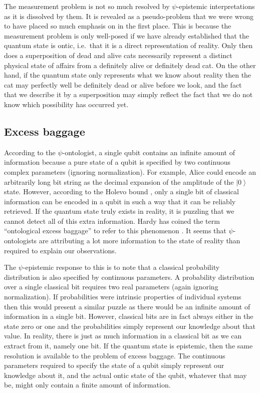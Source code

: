 \documentclass[DIV=calc,paper=a4,fontsize=11pt,twocolumn]{scrartcl} %
\theoremstyle{definition}
\theoremstyle{plain}
\newcommand{\Ket}[1]{\ensuremath{\left \vert #1 \right \rangle}}
\begin{document}
The measurement problem is not so much resolved by $\psi$-epistemic
interpretations as it is dissolved by them.  It is revealed as a
pseudo-problem that we were wrong to have placed so much emphasis on
in the first place.  This is because the measurement problem is only
well-posed if we have already established that the quantum state is
ontic, i.e.\ that it is a direct representation of reality.  Only then
does a superposition of dead and alive cats necessarily represent a
distinct physical state of affairs from a definitely alive or
definitely dead cat.  On the other hand, if the quantum state only
represents what we know about reality then the cat may perfectly well
be definitely dead or alive before we look, and the fact that we
describe it by a superposition may simply reflect the fact that we do
not know which possibility has occurred yet.

\subsection{Excess baggage}

\label{Excess}

According to the $\psi$-ontologist, a single qubit contains an
infinite amount of information because a pure state of a qubit is
specified by two continuous complex parameters (ignoring
normalization).  For example, Alice could encode an arbitrarily long
bit string as the decimal expansion of the amplitude of the $\Ket{0}$
state.  However, according to the Holevo bound \cite{Holevo1973}, only
a single bit of classical information can be encoded in a qubit in
such a way that it can be reliably retrieved.  If the quantum state
truly exists in reality, it is puzzling that we cannot detect all of
this extra information.  Hardy has coined the term ``ontological
excess baggage'' to refer to this phenomenon \cite{Hardy2004}.  It
seems that $\psi$-ontologists are attributing a lot more information
to the state of reality than required to explain our observations.

The $\psi$-epistemic response to this is to note that a classical
probability distribution is also specified by continuous parameters.
A probability distribution over a single classical bit requires two
real parameters (again ignoring normalization).  If probabilities were
intrinsic properties of individual systems then this would present a
similar puzzle as there would be an infinite amount of information in
a single bit.  However, classical bits are in fact always either in
the state zero or one and the probabilities simply represent our
knowledge about that value.  In reality, there is just as much
information in a classical bit as we can extract from it, namely one
bit.  If the quantum state is epistemic, then the same resolution is
available to the problem of excess baggage.  The continuous parameters
required to specify the state of a qubit simply represent our
knowledge about it, and the actual ontic state of the qubit, whatever
that may be, might only contain a finite amount of information.
\end{document}
